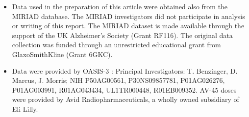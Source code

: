 \begin{itemize}
\item Data used in the preparation of this article were obtained also from the MIRIAD database.
The MIRIAD investigators did not participate in analysis or writing of this report.
The MIRIAD dataset is made available through the support of the UK Alzheimer's Society (Grant RF116).
The original data collection was funded through an unrestricted educational grant from GlaxoSmithKline (Grant 6GKC).
\item Data were provided by OASIS-3 \citep{oasis3}: Principal Investigators: T. Benzinger, D. Marcus, J. Morris; NIH P50AG00561, P30NS09857781, P01AG026276, P01AG003991, R01AG043434, UL1TR000448, R01EB009352. AV-45 doses were provided by Avid Radiopharmaceuticals, a wholly owned subsidiary of Eli Lilly.
\end{itemize}

